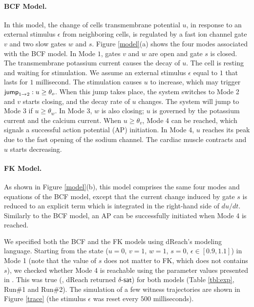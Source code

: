 \paragraph{BCF Model.}
In this model, the change of cells transmembrane potential $u$, in response to an external stimulus $\epsilon$ from neighboring cells, is regulated by a fast ion channel gate $v$ and two slow gates $w$ and $s$.
Figure \ref{model}(a) shows the four modes associated with the BCF model. In Mode $1$, gates $v$ and $w$ are open and gate $s$ is closed. The transmembrane potassium current causes the decay of $u$. The cell is resting and waiting for stimulation. We assume an external stimulus $\epsilon$ equal to $1$ that lasts for $1$ millisecond. The stimulation causes $u$ to increase, which may trigger $\mathsf{jump}_{1 \rightarrow 2}: u \geq \theta_o$. When this jump takes place, the system switches to Mode 2 and $v$ starts closing, and the decay rate of $u$ changes. The system will jump to Mode 3 if $u \geq \theta_w$. In Mode 3, $w$ is also closing; $u$ is governed by the potassium current and the calcium current. When $u \geq \theta_v$, Mode 4 can be reached, which signals a successful action potential (AP) initiation. In Mode 4, $u$ reaches its peak due to the fast opening of the sodium channel. The cardiac muscle contracts and $u$ starts decreasing.
\paragraph{FK Model.}
As shown in Figure \ref{model}(b), this model comprises the same four modes and equations of the BCF model, except that the current change induced by gate $s$ is reduced to an explicit term which is integrated in the right-hand side of $du/dt$. Similarly to the BCF model, an AP can be successfully initiated when Mode 4 is reached.

We specified both the BCF and the FK models using dReach's modeling language. %
Starting from the state ($u = 0$, $v = 1$, $w = 1$, $s = 0$, $\epsilon \in [0.9, 1.1]$) in Mode 1 (note that the value of $s$ does not matter to FK, which does not contains $s$), we checked whether Mode 4 is reachable using the parameter values presented in \cite{orovio08}. This was true (\ie, dReach returned $\delta$-$\mathsf{sat}$) for both models (Table \ref{tbl:exp}, Run\#1 and Run\#2).
The simulation of a few witness trajectories are shown in Figure \ref{trace} (the stimulus $\epsilon$ was reset every $500$ milliseconds).


